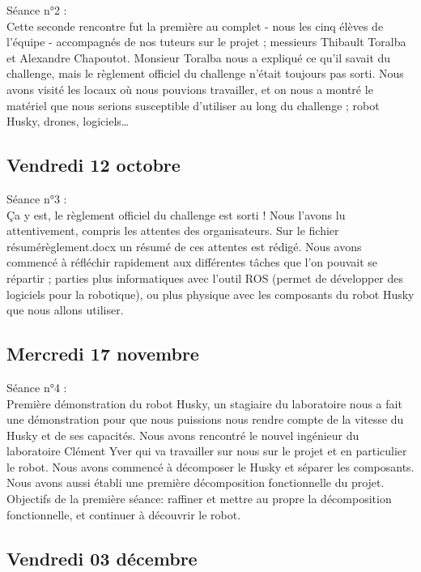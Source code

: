 \documentclass[11pt]{article}
\begin{document}
Séance n°2 : \\

Cette seconde rencontre fut la première au complet - nous les cinq élèves de l’équipe - accompagnés de nos tuteurs sur le projet ; messieurs Thibault Toralba et Alexandre Chapoutot. Monsieur Toralba nous a expliqué ce qu’il savait du challenge, mais le règlement officiel du challenge n’était toujours pas sorti. Nous avons visité les locaux où nous pouvions travailler, et on nous a montré le matériel que nous serions susceptible d’utiliser au long du challenge ; robot Husky, drones, logiciels…

\subsection{Vendredi 12 octobre}

Séance n°3 :\\

Ça y est, le règlement officiel du challenge est sorti ! Nous l’avons lu attentivement, compris les attentes des organisateurs. Sur le fichier résumé\textunderscore règlement.docx un résumé de ces attentes est rédigé. Nous avons commencé à réfléchir rapidement aux différentes tâches que l’on pouvait se répartir ; parties plus informatiques avec l’outil ROS (permet de développer des logiciels pour la robotique), ou plus physique avec les composants du robot Husky que nous allons utiliser.
 
\subsection{Mercredi 17 novembre}

Séance n°4 :\\

Première démonstration du robot Husky, un stagiaire du laboratoire nous a fait une démonstration pour que nous puissions nous rendre compte de la vitesse du Husky et de ses capacités. Nous avons rencontré le nouvel ingénieur du laboratoire Clément Yver qui va travailler sur nous sur le projet et en particulier le robot. Nous avons commencé à décomposer le Husky et séparer les composants. Nous avons aussi établi une première décomposition fonctionnelle du projet.
Objectifs de la première séance: raffiner et mettre au propre la décomposition fonctionnelle, et continuer à découvrir le robot.

\subsection{Vendredi 03 décembre} 
\end{document}

